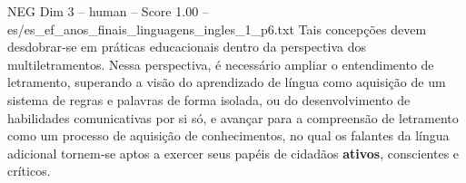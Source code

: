 \begin{textsample}{NEG Dim 3 – human – Score 1.00 – es/es\_ef\_anos\_finais\_linguagens\_ingles\_1\_p6.txt}  \label{ex:f3_neg_005}
Tais concepções devem desdobrar‐se em práticas educacionais dentro da perspectiva dos multiletramentos.
Nessa perspectiva, é necessário ampliar o entendimento de letramento, superando a visão do aprendizado de língua como aquisição de um sistema de regras e palavras de forma isolada, ou do desenvolvimento de habilidades comunicativas por si só, e avançar para a compreensão de letramento como um processo de aquisição de conhecimentos, no qual os falantes da língua adicional tornem‐se aptos a exercer seus papéis de cidadãos \textbf{ativos}, conscientes e críticos.

\end{textsample}
